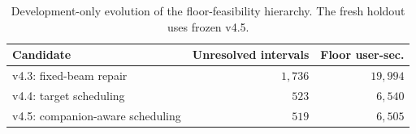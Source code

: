 \begin{table}[t]
\caption{Development-only evolution of the floor-feasibility hierarchy. The fresh holdout uses frozen v4.5.}
\label{tab:development-ablation}
\centering
\footnotesize
\setlength{\tabcolsep}{3.0pt}
\renewcommand{\arraystretch}{1.06}
\begin{tabular}{@{}lrr@{}}
\toprule
Candidate & Unresolved intervals & Floor user-sec.\\
\midrule
v4.3: fixed-beam repair & $1{,}736$ & $19{,}994$\\
v4.4: target scheduling & $523$ & $6{,}540$\\
v4.5: companion-aware scheduling & $519$ & $6{,}505$\\
\bottomrule
\end{tabular}
\end{table}
